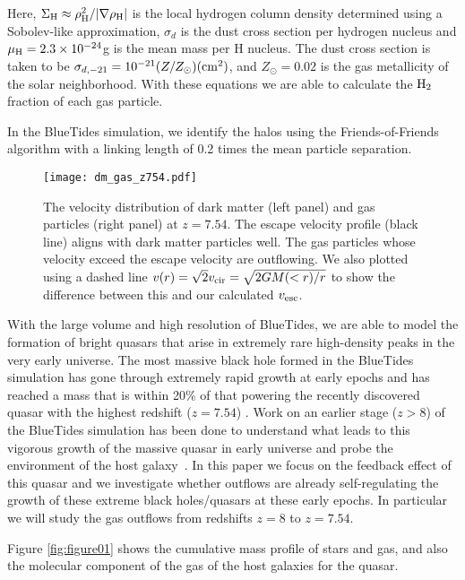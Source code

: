 \documentclass[a4paper,usenatbib]{mnras}
\begin{document}
Here, $\Sigma_{\rm{H}} \approx \rho_{\rm{H}}^2/|\nabla\rho_{\rm{H}}|$ is the local hydrogen column density determined using a Sobolev-like approximation, $\sigma_{d}$ is the dust cross section per hydrogen nucleus and $\mu_{\rm{H}}=2.3 \times 10^{-24}$g is the mean mass per H nucleus. 
The dust cross section is taken to be $\sigma_{d,-21} = 10^{-21} (Z/Z_{\odot})(\rm{cm}^2)$, and $Z_{\odot}=0.02$ is the gas metallicity of the solar neighborhood. 
With these equations we are able to calculate the $\rm{H}_2$ fraction of each gas particle.
 
In the BlueTides simulation, we identify the halos using the Friends-of-Friends algorithm with a linking length of 0.2 times the mean particle separation.

\begin{figure*}
\texttt{[image: dm\_gas\_z754.pdf]}
    \caption{The velocity distribution of dark matter (left panel) and gas particles (right panel) at $z=7.54$. The escape velocity profile (black line) aligns with dark matter particles well. The gas particles whose velocity exceed the escape velocity are outflowing. We also plotted using a dashed line $v(r)=\sqrt{2}v_{\rm cir}=\sqrt{2GM(<r)/r}$ to show the difference between this and our calculated $v_{\rm esc}$.}
    \label{fig:figure2}
\end{figure*}

With the large volume and high resolution of BlueTides, we are able to model the formation of bright quasars that arise in extremely rare high-density peaks in the very early universe.
The most massive black hole formed in the BlueTides simulation has gone through extremely rapid growth at early epochs and has reached a mass that is within 20\% of that powering the recently discovered quasar with the highest redshift ($z=7.54$) \citep{Banados}.
Work on an earlier stage ($z>8$) of the BlueTides simulation has been done to understand what leads to this vigorous growth of the massive quasar in early universe and probe the environment of the host galaxy~\citep{DiMatteo2017}. 
In this paper we focus on the feedback effect of this quasar and we investigate whether outflows are already self-regulating the growth of these extreme black holes/quasars at these early epochs.
In particular we will study the gas outflows from redshifts $z=8$ to $z=7.54$. 

Figure \ref{fig:figure01} shows the cumulative mass profile of stars and gas, and also the molecular component of the gas of the host galaxies for the quasar.
\end{document}
